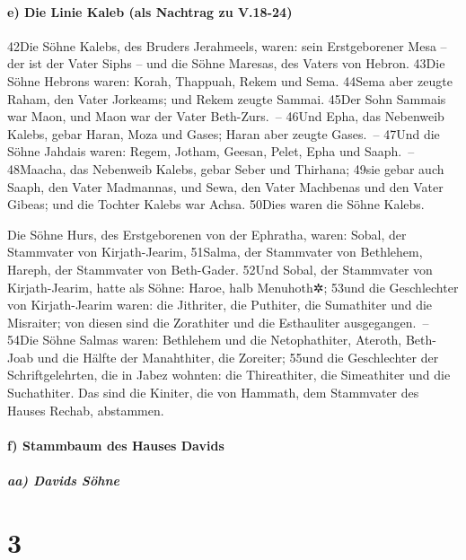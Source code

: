 \hypertarget{e-die-linie-kaleb-als-nachtrag-zu-v.18-24}{%
\paragraph{e) Die Linie Kaleb (als Nachtrag zu
V.18-24)}\label{e-die-linie-kaleb-als-nachtrag-zu-v.18-24}}

42Die Söhne Kalebs, des Bruders Jerahmeels, waren: sein Erstgeborener
Mesa -- der ist der Vater Siphs -- und die Söhne Maresas, des Vaters von
Hebron. 43Die Söhne Hebrons waren: Korah, Thappuah, Rekem und Sema.
44Sema aber zeugte Raham, den Vater Jorkeams; und Rekem zeugte Sammai.
45Der Sohn Sammais war Maon, und Maon war der Vater Beth-Zurs.~-- 46Und
Epha, das Nebenweib Kalebs, gebar Haran, Moza und Gases; Haran aber
zeugte Gases.~-- 47Und die Söhne Jahdais waren: Regem, Jotham, Geesan,
Pelet, Epha und Saaph.~-- 48Maacha, das Nebenweib Kalebs, gebar Seber
und Thirhana; 49sie gebar auch Saaph, den Vater Madmannas, und Sewa, den
Vater Machbenas und den Vater Gibeas; und die Tochter Kalebs war Achsa.
50Dies waren die Söhne Kalebs.

Die Söhne Hurs, des Erstgeborenen von der Ephratha, waren: Sobal, der
Stammvater von Kirjath-Jearim, 51Salma, der Stammvater von Bethlehem,
Hareph, der Stammvater von Beth-Gader. 52Und Sobal, der Stammvater von
Kirjath-Jearim, hatte als Söhne: Haroe, halb Menuhoth✲; 53und die
Geschlechter von Kirjath-Jearim waren: die Jithriter, die Puthiter, die
Sumathiter und die Misraiter; von diesen sind die Zorathiter und die
Esthauliter ausgegangen.~-- 54Die Söhne Salmas waren: Bethlehem und die
Netophathiter, Ateroth, Beth-Joab und die Hälfte der Manahthiter, die
Zoreiter; 55und die Geschlechter der Schriftgelehrten, die in Jabez
wohnten: die Thireathiter, die Simeathiter und die Suchathiter. Das sind
die Kiniter, die von Hammath, dem Stammvater des Hauses Rechab,
abstammen.

\hypertarget{f-stammbaum-des-hauses-davids}{%
\paragraph{f) Stammbaum des Hauses
Davids}\label{f-stammbaum-des-hauses-davids}}

\hypertarget{aa-davids-suxf6hne}{%
\subparagraph{aa) Davids Söhne}\label{aa-davids-suxf6hne}}

\hypertarget{section-2}{%
\section{3}\label{section-2}}

